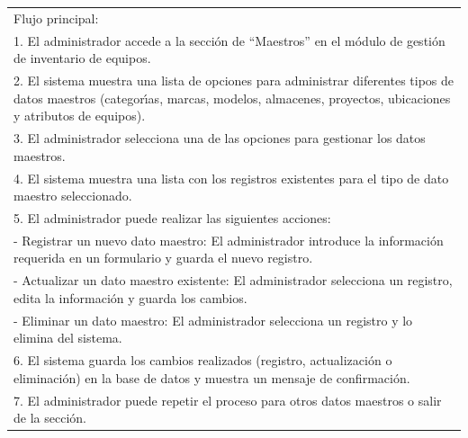 \documentclass[stu, 12pt, letterpaper, donotrepeattitle, floatsintext, natbib]{apa7}
\begin{document}
\begin{longtable}{@{} p{16.5cm} @{}}
    Flujo principal:                                                                                                                                                                              \\
    1. El administrador accede a la secci\'on de ``Maestros'' en el m\'odulo de gesti\'on de inventario de equipos.                                                                               \\
    2. El sistema muestra una lista de opciones para administrar diferentes tipos de datos maestros (categor\'{\i}as, marcas, modelos, almacenes, proyectos, ubicaciones y atributos de equipos). \\
    3. El administrador selecciona una de las opciones para gestionar los datos maestros.                                                                                                         \\
    4. El sistema muestra una lista con los registros existentes para el tipo de dato maestro seleccionado.                                                                                       \\
    5. El administrador puede realizar las siguientes acciones:                                                                                                                                   \\
    \hspace{1cm}- Registrar un nuevo dato maestro: El administrador introduce la informaci\'on requerida en un formulario y guarda el nuevo registro.                                             \\
    \hspace{1cm}- Actualizar un dato maestro existente: El administrador selecciona un registro, edita la informaci\'on y guarda los cambios.                                                     \\
    \hspace{1cm}- Eliminar un dato maestro: El administrador selecciona un registro y lo elimina del sistema.                                                                                     \\
    6. El sistema guarda los cambios realizados (registro, actualizaci\'on o eliminaci\'on) en la base de datos y muestra un mensaje de confirmaci\'on.                                           \\
    7. El administrador puede repetir el proceso para otros datos maestros o salir de la secci\'on.                                                                                               \\ \midrule

\end{longtable}
\end{document}
